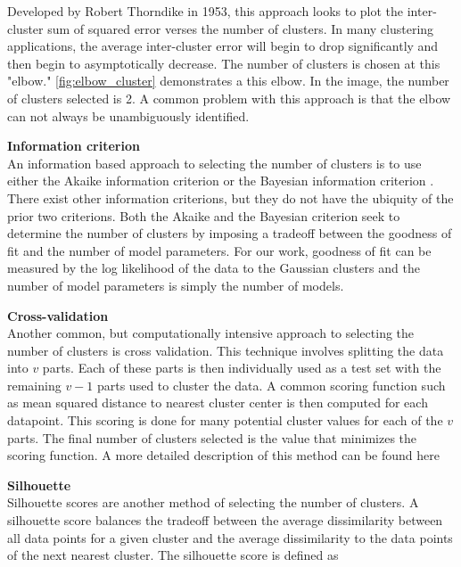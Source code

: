 Developed by Robert Thorndike \cite{Thorndike1953} in 1953, this approach looks to plot the inter-cluster sum of squared error verses the number of clusters.  In many clustering applications, the average inter-cluster error will begin to drop significantly and then begin to asymptotically decrease.  The number of clusters is chosen at this "elbow."  \ref{fig:elbow_cluster} demonstrates a this elbow.  In the image, the number of clusters selected is 2.  A common problem with this approach is that the elbow can not always be unambiguously identified.

\bigskip
\noindent
\textbf{Information criterion} \\
An information based approach to selecting the number of clusters is to use either the Akaike information criterion \cite{Akaike1974} or the Bayesian information criterion \cite{Schwarz1978}.  There exist other information criterions, but they do not have the ubiquity of the prior two criterions.  Both the Akaike and the Bayesian criterion seek to determine the number of clusters by imposing a tradeoff between the goodness of fit and the number of model parameters.  For our work, goodness of fit can be measured by the log likelihood of the data to the Gaussian clusters and the number of model parameters is simply the number of models.  

\bigskip
\noindent
\textbf{Cross-validation} \\
Another common, but computationally intensive approach to selecting the number of clusters is cross validation.  This technique involves splitting the data into $v$ parts.  Each of these parts is then individually used as a test set with the remaining $v-1$ parts used to cluster the data.  A common scoring function such as mean squared distance to nearest cluster center is then computed for each datapoint.  This scoring is done for many potential cluster values for each of the $v$ parts.  The final number of clusters selected is the value that minimizes the scoring function.  A more detailed description of this method can be found here \cite{Statsoft2010}

\bigskip
\noindent
\textbf{Silhouette} \\
Silhouette \cite{Rousseuw1987} scores are another method of selecting the number of clusters.  A silhouette score balances the tradeoff between the average dissimilarity between all data points for a given cluster and the average dissimilarity to the data points of the next nearest cluster.  The silhouette score is defined as

